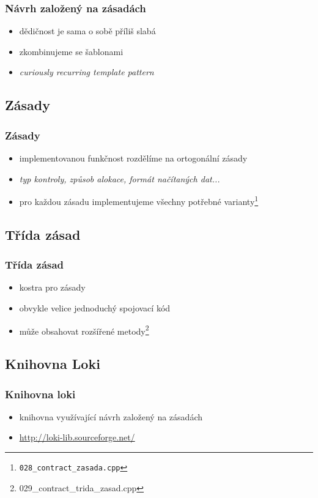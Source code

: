 	\begin{frame}
		\frametitle{Návrh založený na zásadách}
		\begin{itemize}
			\item{dědičnost je sama o sobě příliš slabá}
			\item{zkombinujeme se šablonami}
			\item{\textit{curiously recurring template pattern}}
		\end{itemize}
	\end{frame}

	\subsection{Zásady}

	\begin{frame}
		\frametitle{Zásady}
		\begin{itemize}
			\item{implementovanou funkčnost rozdělíme na ortogonální zásady}
			\item{\textit{typ kontroly, způsob alokace, formát načítaných dat...}}
			\item{pro každou zásadu implementujeme všechny potřebné varianty\footnote{\texttt{028\_contract\_zasada.cpp}}}
		\end{itemize}
	\end{frame}

	\subsection{Třída zásad}

	\begin{frame}
		\frametitle{Třída zásad}
		\begin{itemize}
			\item{kostra pro zásady}
			\item{obvykle velice jednoduchý spojovací kód}
			\item{může obsahovat rozšířené metody\footnote{029\_contract\_trida\_zasad.cpp}}
		\end{itemize}
	\end{frame}

	\subsection{Knihovna Loki}

	\begin{frame}
		\frametitle{Knihovna loki}
		\begin{itemize}
			\item{knihovna využívající návrh založený na zásadách}
			\item{\url{http://loki-lib.sourceforge.net/}}
		\end{itemize}
	\end{frame}

